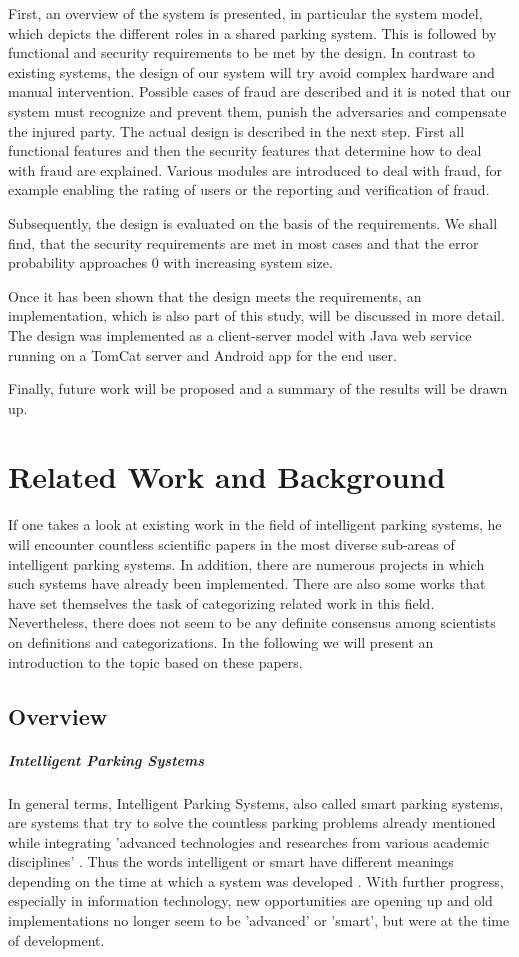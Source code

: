 \documentclass[
a4paper,     %
titlepage,   %
14pt         %
]{scrartcl}  %
\theoremstyle{mystyle}
\begin{document}
First, an overview of the system is presented, in particular the system model, which depicts the different roles in a shared parking system. This is followed by functional and security requirements to be met by the design. In contrast to existing systems, the design of our system will try avoid complex hardware and manual intervention. Possible cases of fraud are described and it is noted that our system must recognize and prevent them, punish the adversaries and compensate the injured party. The actual design is described in the next step. First all functional features and then the security features that determine how to deal with fraud are explained. Various modules are introduced to deal with fraud, for example enabling the rating of users or the reporting and verification of fraud. 

Subsequently, the design is evaluated on the basis of the requirements. We shall find, that the security requirements are met in most cases and that the error probability approaches 0 with increasing system size.

Once it has been shown that the design meets the requirements, an implementation, which is also part of this study, will be discussed in more detail. The design was implemented as a client-server model with Java web service running on a TomCat server and Android app for the end user.

Finally, future work will be proposed and a summary of the results will be drawn up.

\section{Related Work and Background}
If one takes a look at existing work in the field of intelligent parking systems, he will encounter countless scientific papers in the most diverse sub-areas of intelligent parking systems. In addition, there are numerous projects in which such systems have already been implemented. There are also some works that have set themselves the task of categorizing related work in this field. Nevertheless, there does not seem to be any definite consensus among scientists on definitions and categorizations. In the following we will present an introduction to the topic based on these papers.

\subsection{Overview}

\subparagraph{Intelligent Parking Systems}
In general terms, Intelligent Parking Systems, also called smart parking systems, are systems that try to solve the countless parking problems already mentioned while integrating 'advanced technologies and researches from various academic disciplines' \cite{idris2009car}. Thus the words intelligent or smart have different meanings depending on the time at which a system was developed \cite{fraifer2016investigation}. With further progress, especially in information technology, new opportunities are opening up and old implementations no longer seem to be 'advanced' or 'smart', but were at the time of development.
\end{document}
